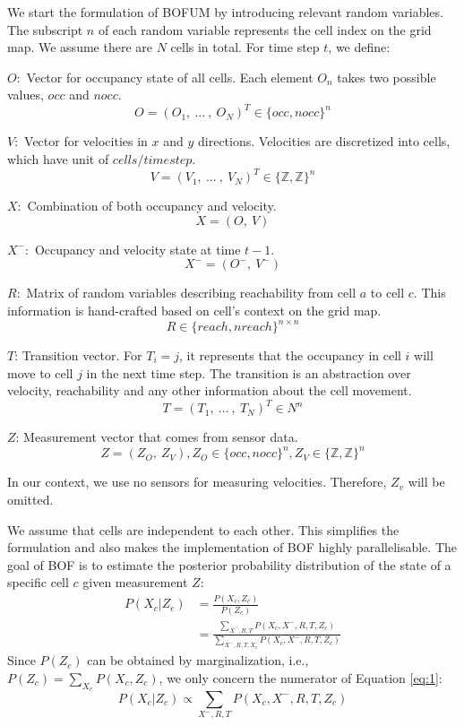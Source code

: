 We start the formulation of BOFUM by introducing relevant random variables. The subscript $n$ of each random variable represents the cell index on the grid map. We assume there are $N$ cells in total. For time step $t$, we define:

\begin{my_enumerate}
\item[] $O:$ Vector for occupancy state of all cells. Each element $O_n$ takes two possible values, $occ$ and $nocc$.
\[ O = (O_1, \ ... \ , \ O_N)^T \in \{ occ, nocc\}^n \]

\item[] $V:$ Vector for velocities in $x$ and $y$ directions. Velocities are discretized into cells, which have unit of $cells/timestep$.
\[ V = (V_1, \ ... \ , \ V_N)^T \in \{ \mathbb{Z}, \mathbb{Z}\}^n \]

\item[] $X:$ Combination of both occupancy and velocity. 
\[ X = (O, \ V) \]

\item[] $X^-:$ Occupancy and velocity state at time $t-1$.
\[ X^- = (O^-, \ V^-) \]

\item[] $R:$ Matrix of random variables describing reachability from cell $a$ to cell $c$. This information is hand-crafted based on cell's context on the grid map. 
\[ R \in \{reach, nreach\}^{n \times n}\]

\item[] $T$: Transition vector. For $T_i = j$, it represents that the occupancy in cell $i$ will move to cell $j$ in the next time step. The transition is an abstraction over velocity, reachability and any other information about the cell movement. 
\[ T = (T_1, \ ... \ , \ T_N)^T \in N^n\]

\item[] $Z$: Measurement vector that comes from sensor data.
\[Z = (Z_O, \ Z_V), Z_O \in  \{ occ, nocc\}^n , Z_V \in \{ \mathbb{Z}, \mathbb{Z}\}^n\]

In our context, we use no sensors for measuring velocities. Therefore, $Z_v$ will be omitted.
\end{my_enumerate}

We assume that cells are independent to each other. This simplifies the formulation and also makes the implementation of BOF highly parallelisable. The goal of BOF is to estimate the posterior probability distribution of the state of a specific cell $c$ given measurement $Z$:
\begin{align}
P(X_c|Z_c) &= \frac{P(X_c, Z_c)}{P(Z_c)} \label{eq:1} \\ 
         &= \frac{\sum_{X^-, R, T}{P(X_c, X^-, R, T, Z_c)}}{\sum_{X^-, R, T, X_c}{P(X_c, X^-, R, T, Z_c)}} 
\end{align}
Since $P(Z_c)$ can be obtained by marginalization, i.e., $P(Z_c)= \sum_{X_c}{P(X_c, Z_c)}$, we only concern the numerator of Equation \ref{eq:1}:
\begin{equation}
P(X_c|Z_c) \propto \sum_{X^-, R, T}{P(X_c, X^-, R, T, Z_c)} \label{eq:4}
\end{equation}

